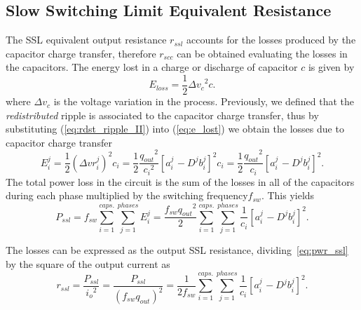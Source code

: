 
\subsection[SSL Equivalent Resistance ]{Slow Switching Limit Equivalent Resistance}

The SSL equivalent output resistance $r_{ssl}$ accounts for the losses produced by the capacitor charge transfer, therefore $r_{scc}$ can be obtained evaluating the losses in the capacitors.  The energy lost in a charge or discharge of capacitor $c$ is given by
\begin{equation}
E_{loss}=\frac{1}{2}{{\Delta{v}}_c}^2 c.
\label{eq:e_lost}
\end{equation}
where $\Delta v_c$ is the voltage variation in the process. Previously, we defined that the \emph{redistributed} ripple is associated to the capacitor charge transfer, thus by substituting (\ref{eq:rdst_ripple_II}) into (\ref{eq:e_lost}) we obtain the losses due to capacitor charge transfer
\begin{equation}
E_i^j=\frac{1}{2}{({\Delta{vr}}_i^j)}^2 c_i = \frac{1}{2}\frac{{q_{out}}^2}{{c_i}^2}{\left[a_{i\
}^j-{D^j} {b_i^j}\right]}^2c_i=\frac{1}{2}\frac{{q_{out}}^2}{c_i}{\left[a_{i\
}^j-{D^j} {b_i^j}\right]}^2 .
\label{eq:e_lost_ssl}
\end{equation}
The total power loss in the circuit is the sum of the losses in all of the
capacitors during each phase multiplied by the switching frequency$f_{sw}$.
This yield{\small s}
\begin{equation}
P_{ssl}= f_{sw} \sum_{i=1}^{caps.}\sum_{j=1}^{phases} E_i^j =\frac{f_{sw}{q_{out}}^2}{2}\sum_{i=1}^{caps.}\sum_{j=1}^{phases}\frac{1}{c_i}{\left[a_{i\
}^j-{D^j}{b_i^j}\right]}^2.
\label{eq:pwr_ssl}
\end{equation}

The losses can be expressed as the output SSL resistance, dividing~\eqref{eq:pwr_ssl} by the
square of the output current as
\begin{equation}
r_{ssl}=\frac{P_{ssl}}{{i_o}^2}=\frac{P_{ssl}}{{(f_{sw} {q_{out}})}^2}=\frac{1}{2 f_{sw}}\sum_{i=1}^{caps.}\sum_{j=1}^{phases}\frac{1}{c_i}{\left[a_{i\
}^j-{D^j} {b_i^j}\right]}^2.
\label{eq:r_ssl}
\end{equation}


